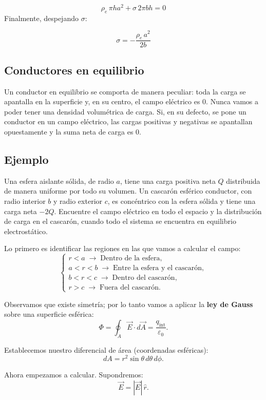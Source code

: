 \documentclass[a4paper,12pt]{article}
\begin{document}
\[
\rho_e\, \pi h a^{2} + \sigma\, 2\pi b h = 0
\]
Finalmente, despejando \(\sigma\):

\[
\sigma = -\frac{\rho_e\, a^{2}}{2b}
\]

\subsection{Conductores en equilibrio}
\noindent
Un conductor en equilibrio se comporta de manera peculiar: toda la carga se apantalla en la superficie y, en su centro, el campo eléctrico es \(0\). Nunca vamos a poder tener una densidad volumétrica de carga. Si, en su defecto, se pone un conductor en un campo eléctrico, las cargas positivas y negativas se apantallan opuestamente y la suma neta de carga es \(0\).

\subsection*{Ejemplo}
\noindent
Una esfera aislante sólida, de radio \(a\), tiene una carga positiva neta \(Q\) distribuida de manera uniforme por todo su volumen.
Un cascarón esférico conductor, con radio interior \(b\) y radio exterior \(c\), es concéntrico con la esfera sólida y tiene una carga neta \(-2Q\).
Encuentre el campo eléctrico en todo el espacio y la distribución de carga en el cascarón, cuando todo el sistema se encuentra en equilibrio electrostático.

\medskip
\noindent
Lo primero es identificar las regiones en las que vamos a calcular el campo:
\[
\left\{
\begin{array}{l}
r<a \;\rightarrow\; \text{Dentro de la esfera},\\
a<r<b \;\rightarrow\; \text{Entre la esfera y el cascarón},\\
b<r<c \;\rightarrow\; \text{Dentro del cascarón},\\
r>c \;\rightarrow\; \text{Fuera del cascarón}.
\end{array}
\right.
\]

\medskip
\noindent
Observamos que existe simetría; por lo tanto vamos a aplicar la \textbf{ley de Gauss} sobre una superficie esférica:
\[
\Phi=\oint_{A}\vec E\cdot d\vec A=\frac{q_{\text{int}}}{\varepsilon_0}.
\]

\noindent
Establecemos nuestro diferencial de área (coordenadas esféricas):
\[
dA=r^{2}\sin\theta\, d\theta\, d\phi .
\]

\medskip
\noindent
Ahora empezamos a calcular. Supondremos:
\[
\vec E=|\vec E|\,\hat r .
\]
\end{document}
